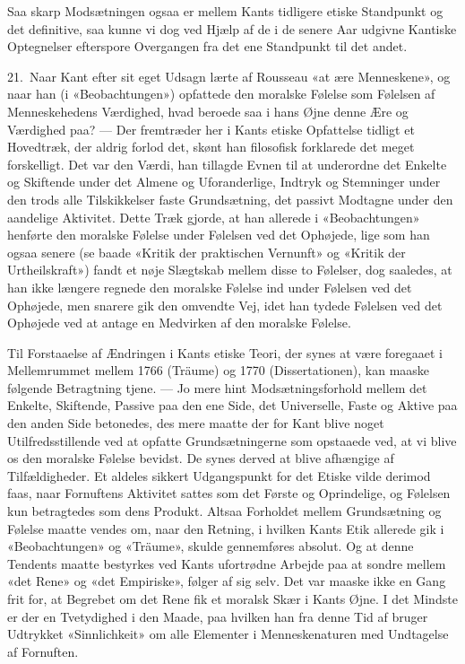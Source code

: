 \documentclass[12pt,a4paper]{article}
\begin{document}
Saa skarp Modsætningen ogsaa er mellem Kants tidligere etiske Standpunkt
og det definitive, saa kunne vi dog ved Hjælp af de i de senere Aar
udgivne Kantiske Optegnelser efterspore Overgangen fra det ene Standpunkt
til det andet.

21.\ Naar Kant efter sit eget Udsagn lærte af Rousseau «at ære
Menneskene», og naar han (i «Beobachtungen») opfattede den moralske
Følelse som Følelsen af Menneskehedens Værdighed, hvad beroede saa i hans
Øjne denne Ære og Værdighed paa? --- Der fremtræder her i Kants etiske
Opfattelse tidligt et Hovedtræk, der aldrig forlod det, skønt han
filosofisk forklarede det meget forskelligt. Det var den Værdi, han
tillagde Evnen til at underordne det Enkelte og Skiftende under det
Almene og Uforanderlige, Indtryk og Stemninger under den trods alle
Tilskikkelser faste Grundsætning, det passivt Modtagne under den
aandelige Aktivitet. Dette Træk gjorde, at han allerede i «Beobachtungen»
henførte den moralske Følelse under Følelsen ved det Ophøjede, lige som
han ogsaa senere (se baade «Kritik der praktischen Vernunft» og «Kritik
der Urtheilskraft») fandt et nøje Slægtskab mellem disse to Følelser, dog
saaledes, at han ikke længere regnede den moralske Følelse ind under
Følelsen ved det Ophøjede, men snarere gik den omvendte Vej, idet han
tydede Følelsen ved det Ophøjede ved at antage en Medvirken af den
moralske Følelse.

Til Forstaaelse af Ændringen i Kants etiske Teori, der synes at være
foregaaet i Mellemrummet mellem 1766 (Träume) og 1770 (Dissertationen),
kan maaske følgende Betragtning tjene. --- Jo mere hint
Modsætningsforhold mellem det Enkelte, Skiftende, Passive paa den ene
Side, det Universelle, Faste og Aktive paa den anden Side betonedes, des
mere maatte der for Kant blive noget Utilfredsstillende ved at opfatte
Grundsætningerne som opstaaede ved, at vi blive os den moralske Følelse
bevidst. De synes derved at blive afhængige af Tilfældigheder. Et aldeles
sikkert Udgangspunkt for det Etiske vilde derimod faas, naar Fornuftens
Aktivitet sattes som det Første og Oprindelige, og Følelsen kun
betragtedes som dens Produkt. Altsaa Forholdet mellem Grundsætning og
Følelse maatte vendes om, naar den Retning, i hvilken Kants Etik allerede
gik i «Beobachtungen» og «Träume», skulde gennemføres absolut. Og at
denne Tendents maatte bestyrkes ved Kants ufortrødne Arbejde paa at
sondre mellem «det Rene» og «det Empiriske», følger af sig selv. Det var
maaske ikke en Gang frit for, at Begrebet om det Rene fik et moralsk Skær
i Kants Øjne. I det Mindste er der en Tvetydighed i den Maade, paa hvilken
han fra denne Tid af bruger Udtrykket «Sinnlichkeit» om alle Elementer i
Menneskenaturen med Undtagelse af Fornuften.
\end{document}
